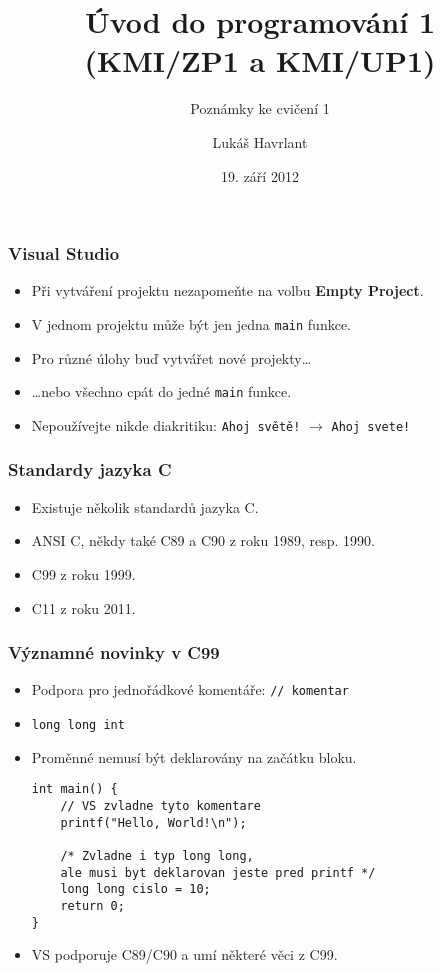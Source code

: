 \documentclass{beamer}
\title{Úvod do programování 1 (KMI/ZP1 a KMI/UP1)}
\subtitle{Poznámky ke cvičení 1}
\author{Lukáš Havrlant}
\date{19. září 2012}
\institute{Univerzita Palackého}
\newenvironment{itemizex}%
  {\large \begin{itemize}%
    \setlength{\itemsep}{8pt}%
    \setlength{\parskip}{8pt}}%
  {\end{itemize}}
\begin{document}
\begin{frame}[t,plain]
\titlepage
\end{frame}

\begin{frame}[t,fragile]\frametitle{Visual Studio} 
  \begin{itemizex}
    \item Při vytváření projektu nezapomeňte na volbu \textbf{Empty Project}.
    \item V jednom projektu může být jen jedna \texttt{main} funkce. 
    \item Pro různé úlohy buď vytvářet nové projekty\dots
    \item \dots nebo všechno cpát do jedné \texttt{main} funkce.
    \item Nepoužívejte nikde diakritiku: \texttt{Ahoj světě!} $\longrightarrow$ \texttt{Ahoj svete!}
  \end{itemizex}
\end{frame}



\begin{frame}[t,fragile]\frametitle{Standardy jazyka C} 
  \begin{itemizex}
    \item Existuje několik standardů jazyka C. 
    \item ANSI C, někdy také C89 a C90 z roku 1989, resp. 1990.
    \item C99 z roku 1999.
    \item C11 z roku 2011. 
  \end{itemizex}
\end{frame}


\begin{frame}[t,fragile]\frametitle{Významné novinky v C99} 
  \begin{itemize}
    \item Podpora pro jednořádkové komentáře: \texttt{// komentar}
    \item \texttt{long long int}
    \item Proměnné nemusí být deklarovány na začátku bloku.
    \begin{verbatim} 
int main() {
    // VS zvladne tyto komentare
    printf("Hello, World!\n");

    /* Zvladne i typ long long, 
    ale musi byt deklarovan jeste pred printf */
    long long cislo = 10; 
    return 0;
}
    \end{verbatim}
    \item VS podporuje C89/C90 a umí některé věci z C99.
  \end{itemize}
\end{frame}
\end{document}
